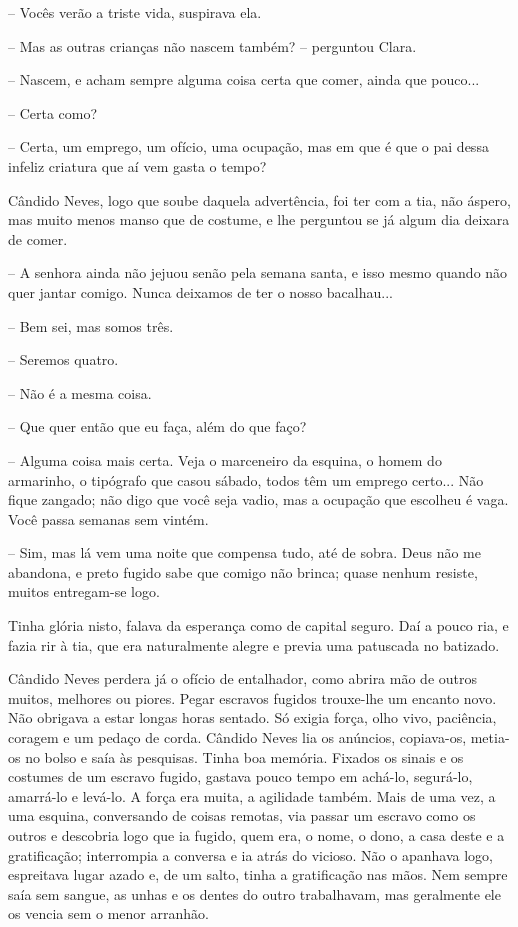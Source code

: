 -- Vocês verão a triste vida, suspirava ela.

-- Mas as outras crianças não nascem também? -- perguntou Clara.

-- Nascem, e acham sempre alguma coisa certa que comer, ainda que
pouco...

-- Certa como?

-- Certa, um emprego, um ofício, uma ocupação, mas em que é que o pai
dessa infeliz criatura que aí vem gasta o tempo?

Cândido Neves, logo que soube daquela advertência, foi ter com a tia,
não áspero, mas muito menos manso que de costume, e lhe perguntou se já
algum dia deixara de comer.

-- A senhora ainda não jejuou senão pela semana santa, e isso mesmo
quando não quer jantar comigo. Nunca deixamos de ter o nosso bacalhau...

-- Bem sei, mas somos três.

-- Seremos quatro.

-- Não é a mesma coisa.

-- Que quer então que eu faça, além do que faço?

-- Alguma coisa mais certa. Veja o marceneiro da esquina, o homem do
armarinho, o tipógrafo que casou sábado, todos têm um emprego certo...
Não fique zangado; não digo que você seja vadio, mas a ocupação que
escolheu é vaga. Você passa semanas sem vintém.

-- Sim, mas lá vem uma noite que compensa tudo, até de sobra. Deus não
me abandona, e preto fugido sabe que comigo não brinca; quase nenhum
resiste, muitos entregam-se logo.

Tinha glória nisto, falava da esperança como de capital seguro. Daí a
pouco ria, e fazia rir à tia, que era naturalmente alegre e previa uma
patuscada no batizado.

Cândido Neves perdera já o ofício de entalhador, como abrira mão de
outros muitos, melhores ou piores. Pegar escravos fugidos trouxe-lhe um
encanto novo. Não obrigava a estar longas horas sentado. Só exigia
força, olho vivo, paciência, coragem e um pedaço de corda. Cândido Neves
lia os anúncios, copiava-os, metia-os no bolso e saía às pesquisas.
Tinha boa memória. Fixados os sinais e os costumes de um escravo fugido,
gastava pouco tempo em achá-lo, segurá-lo, amarrá-lo e levá-lo. A força
era muita, a agilidade também. Mais de uma vez, a uma esquina,
conversando de coisas remotas, via passar um escravo como os outros e
descobria logo que ia fugido, quem era, o nome, o dono, a casa deste e a
gratificação; interrompia a conversa e ia atrás do vicioso. Não o
apanhava logo, espreitava lugar azado e, de um salto, tinha a
gratificação nas mãos. Nem sempre saía sem sangue, as unhas e os dentes
do outro trabalhavam, mas geralmente ele os vencia sem o menor arranhão.

